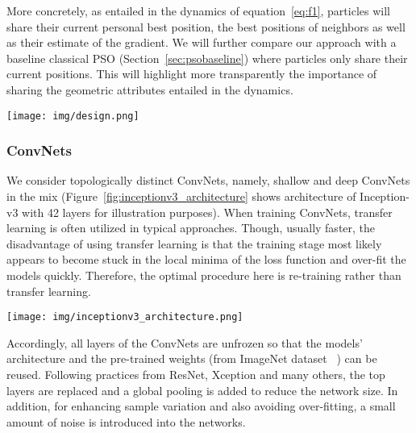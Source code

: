 \documentclass{ieeeaccess}
\begin{document}
More concretely, as entailed in the dynamics of equation~\eqref{eq:f1}, particles will share their current personal best position, the best positions of neighbors as well as their estimate of the gradient. We will further compare our approach with a baseline classical PSO (Section~\ref{sec:psobaseline}) where particles only share their current positions. This will highlight more transparently the importance of sharing the geometric attributes entailed in the dynamics.
\begin{figure*}[p]
\begin{center}
\texttt{[image: img/design.png]}
\caption{Proposed PSO-ConvNets system. PSOs share information with other particles via a file sharing. The information include current location, previous location among the others.}
\label{fig:ecosystem}
\end{center}
\end{figure*}
\subsubsection{ConvNets}
\label{sec:convnets}
We consider topologically distinct ConvNets, namely, shallow and deep ConvNets in the mix (Figure~\ref{fig:inceptionv3_architecture} shows architecture of Inception-v3 with 42 layers for illustration purposes). When training ConvNets, transfer learning is often utilized in typical approaches. Though, usually faster, the disadvantage of using transfer learning is that the training stage most likely appears to become stuck in the local minima of the loss function and over-fit the models quickly. Therefore, the optimal procedure here is re-training rather than transfer learning.
\begin{figure*}[p]
\begin{center}
\texttt{[image: img/inceptionv3\_architecture.png]}
\caption{Detail of Inception-v3 architecture~\cite{szegedy2017inception} which contains initial layers and several modules A, B and C. Each module comprises factorized convolutions to reduce the computational cost as it decreases the number of parameters.}
\label{fig:inceptionv3_architecture}
\end{center}
\end{figure*}


Accordingly, all layers of the ConvNets are unfrozen so that the models' architecture and the pre-trained weights (from ImageNet dataset ~\cite{krizhevsky2012imagenet,russakovsky2015imagenet}) can be reused. Following practices from ResNet, Xception and many others, the top layers are replaced and a global pooling is added to reduce the network size. In addition, for enhancing sample variation and also avoiding over-fitting, a small amount of noise is introduced into the networks. 
\end{document}
